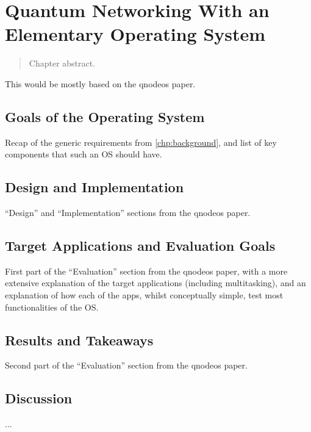 \chapter{Quantum Networking With an Elementary Operating System}
\label{chp:qnodeos}

\begin{abstract}
Chapter abstract.
\end{abstract}


\newpage


\noindent
This would be mostly based on the \acrshort{qnodeos} paper.

\section{Goals of the Operating System}

Recap of the generic requirements from \cref{chp:background}, and list of key components that such
an OS should have.

\section{Design and Implementation}

``Design'' and ``Implementation'' sections from the \acrshort{qnodeos} paper.

\section{Target Applications and Evaluation Goals}

First part of the ``Evaluation'' section from the \acrshort{qnodeos} paper, with a more extensive
explanation of the target applications (including multitasking), and an explanation of how each of
the apps, whilst conceptually simple, test most functionalities of the OS.

\section{Results and Takeaways}

Second part of the ``Evaluation'' section from the \acrshort{qnodeos} paper.

\section{Discussion}

...

\printbibliography[heading=subbibintoc,title={References},notcategory=noprint]

